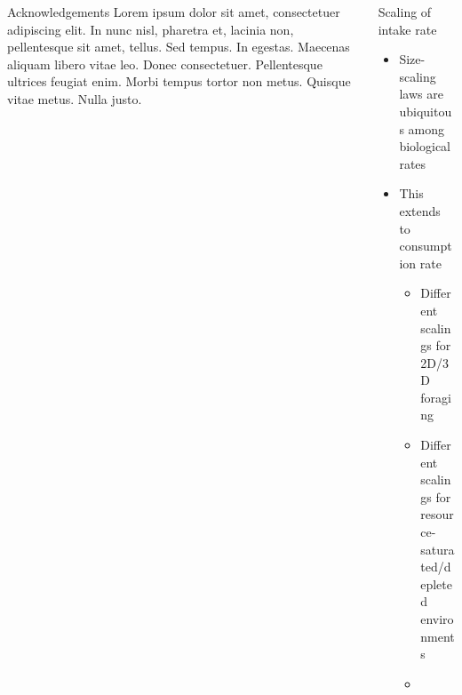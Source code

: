 \documentclass[xcolor={table}]{beamer}
\begin{document}
\begin{frame}[fragile=singleslide,t]
\begin{columns}[onlytextwidth,T]
\begin{column}{.47\textwidth}
\begin{block}{Acknowledgements}
Lorem ipsum dolor sit amet, consectetuer adipiscing elit. In nunc nisl, pharetra et, lacinia non, pellentesque sit amet, tellus. Sed tempus. In egestas. Maecenas aliquam libero vitae leo. Donec consectetuer. Pellentesque ultrices feugiat enim. Morbi tempus tortor non metus. Quisque vitae metus. Nulla justo.
\end{block}

\end{column}


\begin{column}{.47\textwidth}

\begin{block}{Scaling of intake rate}
    \begin{itemize}
        \item Size-scaling laws are ubiquitous among biological rates
        \item This extends to consumption rate \autocite{Pawar2012}
        \begin{itemize}
            \item Different scalings for 2D/3D foraging
            \item Different scalings for resource-saturated/depleted environments
            \item 
        \end{itemize}
    \end{itemize}
\end{block}


\end{column}
\end{columns}
\end{frame}
\end{document}
